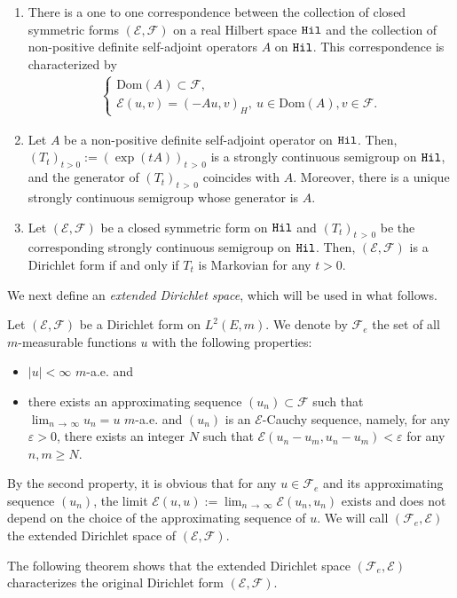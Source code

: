 \documentclass[AHL,Unicode,longabstracts,published]{cedram}
\newcommand{\ce}{\mathcal{E}}
\newcommand{\cf}{\mathcal{F}}
\newcommand{\Dom}{\mathrm{Dom}}
\begin{document}
\begin{theo}\leavevmode
\begin{enumerate}
\item\label{theo3.2.1} There is a one to one correspondence between the collection of closed symmetric forms $(\ce,\cf)$ on a real Hilbert space ${\tt Hil}$ and the collection of non-positive definite self-adjoint operators $A$ on ${\tt Hil}$. This correspondence is characterized by
\begin{align}\label{generator}
\begin{cases}
\Dom(A)\subset\cf,\\
\ce(u,v)=(-Au,v)_{H},\ u\in\Dom(A),v\in\cf.
\end{cases}
\end{align}
\item\label{theo3.2.2} Let $A$ be a non-positive definite self-adjoint operator on ${\tt Hil}$. Then, $(T_t)_{t>0}:=(\exp(tA))_{t\,>\,0}$ is a strongly continuous semigroup on ${\tt Hil}$, and the generator of $(T_t)_{t\,>\,0}$ coincides with $A$. Moreover, there is a unique strongly continuous semigroup whose generator is $A$.
\item\label{theo3.2.3} Let $(\ce,\cf)$ be a closed symmetric form on ${\tt Hil}$ and $(T_t)_{t\,>\,0}$ be the corresponding strongly continuous semigroup on ${\tt Hil}$. Then, $(\ce,\cf)$ is a Dirichlet form if and only if $T_t$ is Markovian for any $t>0$.
\end{enumerate}
\end{theo}

We next define an \emph{extended Dirichlet space}, which will be used in what follows.
\begin{defi}\label{def:ext-dirichlet}
Let $(\ce,\cf)$ be a Dirichlet form on $L^2(E,m)$. We denote by $\cf_e$ the set of all $m$-measurable functions $u$ with the following properties:
\begin{itemize}
\item$|u|<\infty$ $m$-a.e. and
\item there exists an approximating sequence $(u_n)\subset\cf$ such that $\lim_{n\,\to\,\infty}u_n=u$ $m$-a.e. and $(u_n)$ is an $\ce$-Cauchy sequence, namely, for any $\varepsilon>0$, there exists an integer $N$ such that $\ce(u_n-u_m,u_n-u_m)<\varepsilon$ for any $n,m\geq N$.
\end{itemize}
By the second property, it is obvious that for any $u\in\cf_e$ and its approximating sequence $(u_n)$, the limit $\ce(u,u):=\lim_{n\,\to\,\infty}\ce(u_n,u_n)$ exists and does not depend on the choice of the approximating sequence of $u$. We will call $(\cf_e,\ce)$ the extended Dirichlet space of $(\ce,\cf)$.
\end{defi}
The following theorem shows that the extended Dirichlet space $(\cf_e,\ce)$ characterizes the original Dirichlet form $(\ce,\cf)$.
\end{document}
